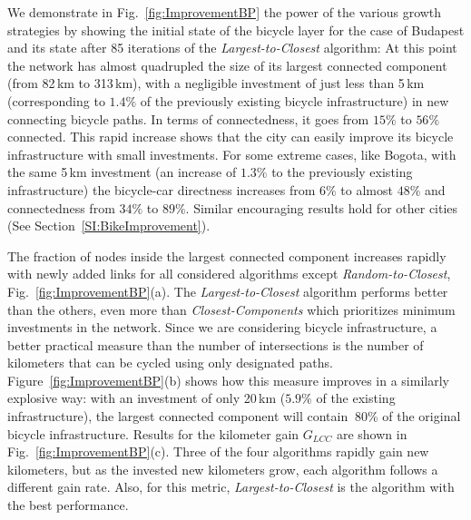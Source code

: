 We demonstrate in Fig.~\ref{fig:ImprovementBP} the power of the various growth strategies by showing the initial state of the bicycle layer for the case of Budapest and its state after 85 iterations of the \emph{Largest-to-Closest} algorithm: At this point the network has almost quadrupled the size of its largest connected component (from 82\,km to 313\,km), with a negligible investment of just less than 5\,km (corresponding to $1.4\%$ of the previously existing bicycle infrastructure) in new connecting bicycle paths. In terms of connectedness, it goes from $15\%$ to $56\%$ connected. This rapid increase shows that the city can easily improve its bicycle infrastructure with small investments. For some extreme cases, like Bogota, with the same 5\,km investment (an increase of $1.3\%$ to the previously existing infrastructure) the bicycle-car directness increases from $6\%$ to almost $48\%$ and connectedness from $34\%$ to $89\%$. Similar encouraging results hold for other cities (See Section~\ref{SI:BikeImprovement}).%

The fraction of nodes inside the largest connected component increases rapidly with newly added links for all considered algorithms except \emph{Random-to-Closest}, Fig.~\ref{fig:ImprovementBP}(a). The \emph{Largest-to-Closest} algorithm performs better than the others, even more than \emph{Closest-Components} which prioritizes minimum investments in the network. Since we are considering bicycle infrastructure, a better practical measure than the number of intersections is the number of kilometers that can be cycled using only designated paths. Figure~\ref{fig:ImprovementBP}(b) shows how this measure improves in a similarly explosive way: with an investment of only 20\,km ($5.9\%$ of the existing infrastructure), the largest connected component will contain $~80\%$ of the original bicycle infrastructure. Results for the kilometer gain $G_{LCC}$ are shown in Fig.~\ref{fig:ImprovementBP}(c). Three of the four algorithms rapidly gain new kilometers, but as the invested new kilometers grow, each algorithm follows a different gain rate. Also, for this metric, \textit{Largest-to-Closest} is the algorithm with the best performance.

